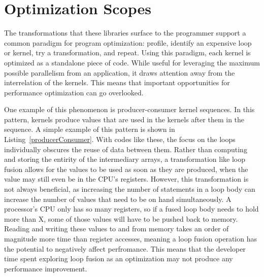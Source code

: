 \section{Optimization Scopes}

The transformations that these libraries surface to the programmer support a common paradigm for program optimization: profile, identify an expensive loop or kernel, try a transformation, and repeat.
Using this paradigm, each kernel is optimized as a standalone piece of code.
While useful for leveraging the maximum possible parallelism from an application, it draws attention away from the interrelation of the kernels.
This means that important opportunities for performance optimization can go overlooked.


One example of this phenomenon is producer-consumer kernel sequences.
In this pattern, kernels produce values that are used in the kernels after them in the sequence.
A simple example of this pattern is shown in Listing~\ref{producerConsumer}.
With codes like these, the focus on the loops individually obscures the reuse of data between them.
Rather than computing and storing the entirity of the intermediary arrays, a transformation like loop fusion allows for the values to be used as soon as they are produced, when the value may still even be in the CPU's registers.
However, this transformation is not always beneficial, as increasing the number of statements in a loop body can increase the number of values that need to be on hand simultaneously. 
A processor's CPU only has so many registers, so if a fused loop body needs to hold more than X, some of those values will have to be pushed back to memory. 
Reading and writing these values to and from memory takes an order of magnitude more time than register accesses, meaning a loop fusion operation has the potential to negatively affect perfromance.
This means that the developer time spent exploring loop fusion as an optimization may not produce any performance improvement.

